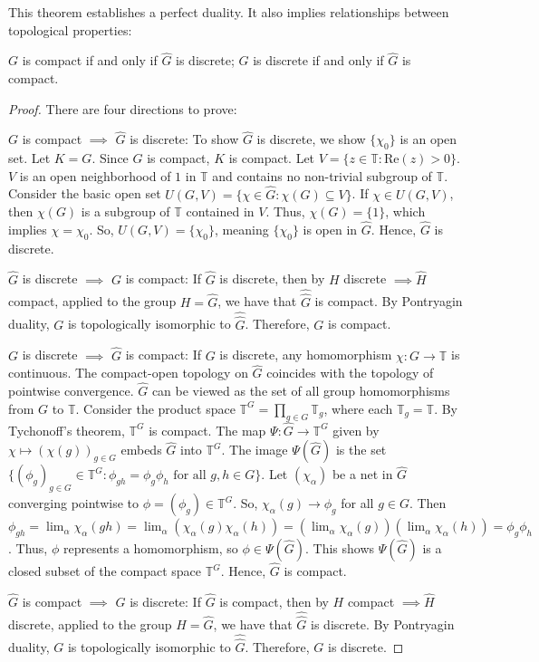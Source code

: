 This theorem establishes a perfect duality. It also implies relationships between topological properties: 

\begin{theorem}
    $G$ is compact if and only if $\hat{G}$ is discrete; $G$ is discrete if and only if $\hat{G}$ is compact.
\end{theorem}

\begin{proof} 
There are four directions to prove:

    $G$ is compact $\implies$ $\hat{G}$ is discrete: To show $\hat{G}$ is discrete, we show $\{\chi_0\}$ is an open set. Let $K=G$. Since $G$ is compact, $K$ is compact. Let $V = \{z \in \mathbb{T} : \text{Re}(z) > 0 \}$. $V$ is an open neighborhood of $1$ in $\mathbb{T}$ and contains no non-trivial subgroup of $\mathbb{T}$. Consider the basic open set $U(G, V) = \{ \chi \in \hat{G} : \chi(G) \subseteq V \}$. If $\chi \in U(G, V)$, then $\chi(G)$ is a subgroup of $\mathbb{T}$ contained in $V$. Thus, $\chi(G) = \{1\}$, which implies $\chi = \chi_0$. So, $U(G, V) = \{\chi_0\}$, meaning $\{\chi_0\}$ is open in $\hat{G}$. Hence, $\hat{G}$ is discrete.

    $\hat{G}$ is discrete $\implies$ $G$ is compact: If $\hat{G}$ is discrete, then by $H$ discrete $\implies \hat{H}$ compact, applied to the group $H = \hat{G}$, we have that $\hat{\hat{G}}$ is compact. By Pontryagin duality, $G$ is topologically isomorphic to $\hat{\hat{G}}$. Therefore, $G$ is compact.

    $G$ is discrete $\implies$ $\hat{G}$ is compact: If $G$ is discrete, any homomorphism $\chi: G \to \mathbb{T}$ is continuous. The compact-open topology on $\hat{G}$ coincides with the topology of pointwise convergence. $\hat{G}$ can be viewed as the set of all group homomorphisms from $G$ to $\mathbb{T}$. Consider the product space $\mathbb{T}^G = \prod_{g \in G} \mathbb{T}_g$, where each $\mathbb{T}_g = \mathbb{T}$. By Tychonoff's theorem, $\mathbb{T}^G$ is compact. The map $\Psi: \hat{G} \to \mathbb{T}^G$ given by $\chi \mapsto (\chi(g))_{g \in G}$ embeds $\hat{G}$ into $\mathbb{T}^G$. The image $\Psi(\hat{G})$ is the set $\{ (\phi_g)_{g \in G} \in \mathbb{T}^G : \phi_{gh} = \phi_g \phi_h \text{ for all } g,h \in G \}$. Let $(\chi_\alpha)$ be a net in $\hat{G}$ converging pointwise to $\phi = (\phi_g) \in \mathbb{T}^G$. So, $\chi_\alpha(g) \to \phi_g$ for all $g \in G$. Then $\phi_{gh} = \lim_\alpha \chi_\alpha(gh) = \lim_\alpha (\chi_\alpha(g)\chi_\alpha(h)) = (\lim_\alpha \chi_\alpha(g))(\lim_\alpha \chi_\alpha(h)) = \phi_g \phi_h$. Thus, $\phi$ represents a homomorphism, so $\phi \in \Psi(\hat{G})$. This shows $\Psi(\hat{G})$ is a closed subset of the compact space $\mathbb{T}^G$. Hence, $\hat{G}$ is compact.

    $\hat{G}$ is compact $\implies$ $G$ is discrete: If $\hat{G}$ is compact, then by $H$ compact $\implies \hat{H}$ discrete, applied to the group $H = \hat{G}$, we have that $\hat{\hat{G}}$ is discrete. By Pontryagin duality, $G$ is topologically isomorphic to $\hat{\hat{G}}$. Therefore, $G$ is discrete.
\end{proof}

